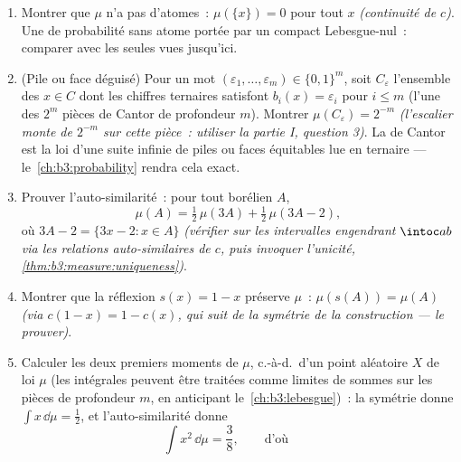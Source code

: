 \begin{problem}
\begin{enumerate}[resume]
        que chaque trou de l'ensemble de Cantor est
        $\mu$-nul ($c$ y est constante), et conclure
        \[
        \mu(C) = 1, \qquad \lambda(C) = 0 :
        \]
        $\mu$ et $\lambda$ vivent sur des supports disjoints
        ($C$ et son complémentaire). Deux  dans cette
        position sont dites \emph{mutuellement singulières},
        noté $\mu \perp \lambda$.
  \item Montrer que $\mu$ n'a pas d'atomes~: $\mu(\{x\}) = 0$
        pour tout $x$ \emph{(continuité de $c$)}. Une 
        de probabilité sans atome portée par un compact
        Lebesgue-nul~: comparer avec les seules  vues
        jusqu'ici.
  \item (Pile ou face déguisé) Pour un mot $(\varepsilon_1,
        \dots, \varepsilon_m) \in \{0,1\}^m$, soit
        $C_{\varepsilon}$ l'ensemble des $x \in C$ dont les
        chiffres ternaires satisfont $b_i(x) = \varepsilon_i$
        pour $i \leq m$ (l'une des $2^m$ pièces de Cantor de
        profondeur $m$). Montrer $\mu(C_\varepsilon) =
        2^{-m}$ \emph{(l'escalier monte de $2^{-m}$ sur cette
        pièce~: utiliser la partie I, question 3)}. La 
        de Cantor est la loi d'une suite infinie de piles ou
        faces équitables lue en ternaire ---
        le~\cref{ch:b3:probability} rendra cela exact.
  \item Prouver l'auto-similarité~: pour tout borélien $A$,
        \[
        \mu(A) = \tfrac12\,\mu(3A) +
        \tfrac12\,\mu(3A - 2) ,
        \]
        où $3A - 2 = \{3x - 2 : x \in A\}$ \emph{(vérifier sur
        les intervalles engendrant $\intoc ab$ via les
        relations auto-similaires de $c$, puis invoquer
        l'unicité, \cref{thm:b3:measure:uniqueness})}.
  \item Montrer que la réflexion $s(x) = 1 - x$ préserve
        $\mu$~: $\mu(s(A)) = \mu(A)$ \emph{(via $c(1 - x) = 1
        - c(x)$, qui suit de la symétrie de la construction
        --- le prouver)}.
  \item Calculer les deux premiers moments de $\mu$, c.-à-d.\
        d'un point aléatoire $X$ de loi $\mu$ (les intégrales
        peuvent être traitées comme limites de sommes sur les
        pièces de profondeur $m$, en anticipant
        le~\cref{ch:b3:lebesgue})~: la symétrie donne $\int
        x\,\dd\mu = \frac12$, et l'auto-similarité donne
        \[
        \int x^2\,\dd\mu = \frac38,
        \qquad\text{d'où}\qquad
\]
\end{enumerate}
\end{problem}
